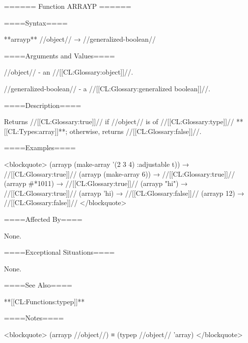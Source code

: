 ====== Function ARRAYP ======

====Syntax====

**arrayp** //object// → //generalized-boolean//

====Arguments and Values====

//object// - an //[[CL:Glossary:object]]//.

//generalized-boolean// - a //[[CL:Glossary:generalized boolean]]//.

====Description====

Returns //[[CL:Glossary:true]]// if //object// is of //[[CL:Glossary:type]]// **[[CL:Types:array]]**; otherwise, returns //[[CL:Glossary:false]]//.

====Examples====

<blockquote> (arrayp (make-array '(2 3 4) :adjustable t)) → //[[CL:Glossary:true]]// (arrayp (make-array 6)) → //[[CL:Glossary:true]]// (arrayp #*1011) → //[[CL:Glossary:true]]// (arrayp "hi") → //[[CL:Glossary:true]]// (arrayp 'hi) → //[[CL:Glossary:false]]// (arrayp 12) → //[[CL:Glossary:false]]// </blockquote>

====Affected By====

None.

====Exceptional Situations====

None.

====See Also====

**[[CL:Functions:typep]]**

====Notes====

<blockquote> (arrayp //object//) ≡ (typep //object// 'array) </blockquote>

